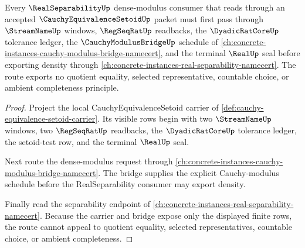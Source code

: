 \begin{theorem}
\label{thm:cauchy-equivalence-setoid-real-separability-forward-scope}
Every $\RealSeparabilityUp$ dense-modulus consumer that reads through an accepted $\CauchyEquivalenceSetoidUp$ packet must first pass through $\StreamNameUp$ windows, $\RegSeqRatUp$ readbacks, the $\DyadicRatCoreUp$ tolerance ledger, the $\CauchyModulusBridgeUp$ schedule of \autoref{ch:concrete-instances-cauchy-modulus-bridge-namecert}, and the terminal $\RealUp$ seal before exporting density through \autoref{ch:concrete-instances-real-separability-namecert}. The route exports no quotient equality, selected representative, countable choice, or ambient completeness principle.
\end{theorem}
\begin{proof}
Project the local CauchyEquivalenceSetoid carrier of \autoref{def:cauchy-equivalence-setoid-carrier}. Its visible rows begin with two $\StreamNameUp$ windows, two $\RegSeqRatUp$ readbacks, the $\DyadicRatCoreUp$ tolerance ledger, the setoid-test row, and the terminal $\RealUp$ seal.

Next route the dense-modulus request through \autoref{ch:concrete-instances-cauchy-modulus-bridge-namecert}. The bridge supplies the explicit Cauchy-modulus schedule before the RealSeparability consumer may export density.

Finally read the separability endpoint of \autoref{ch:concrete-instances-real-separability-namecert}. Because the carrier and bridge expose only the displayed finite rows, the route cannot appeal to quotient equality, selected representatives, countable choice, or ambient completeness.
\end{proof}

